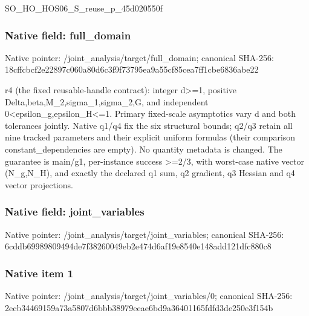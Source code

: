 \documentclass[10pt,a4paper]{article}
\begin{document}
\begingroup\raggedright\sloppy SO\_\allowbreak{}HO\_\allowbreak{}HOS06\_\allowbreak{}S\_\allowbreak{}reuse\_\allowbreak{}p\_\allowbreak{}45d020550f\par\endgroup

\subsubsection{Native field: full\_\allowbreak{}domain}
Native pointer: /joint\_\allowbreak{}analysis/target/full\_\allowbreak{}domain; canonical SHA-256: 18cffcbcf2e22897c060a80d6c3f9f73795ea9a55cf85cea7ff1cbe6836abe22

\begingroup\raggedright\sloppy r4 (the fixed reusable-handle contract):\allowbreak{} integer d>=\allowbreak{}1,\allowbreak{} positive Delta,\allowbreak{}beta,\allowbreak{}M\_\allowbreak{}2,\allowbreak{}sigma\_\allowbreak{}1,\allowbreak{}sigma\_\allowbreak{}2,\allowbreak{}G,\allowbreak{} and independent 0<epsilon\_\allowbreak{}g,\allowbreak{}epsilon\_\allowbreak{}H<=\allowbreak{}1. Primary fixed-scale asymptotics vary d and both tolerances jointly. Native q1/\allowbreak{}q4 fix the six structural bounds;\allowbreak{} q2/\allowbreak{}q3 retain all nine tracked parameters and their explicit uniform formulas (their comparison constant\_\allowbreak{}dependencies are empty). No quantity metadata is changed. The guarantee is main/\allowbreak{}g1,\allowbreak{} per-instance success >=\allowbreak{}2/\allowbreak{}3,\allowbreak{} with worst-case native vector (N\_\allowbreak{}g,\allowbreak{}N\_\allowbreak{}H),\allowbreak{} and exactly the declared q1 sum,\allowbreak{} q2 gradient,\allowbreak{} q3 Hessian and q4 vector projections.\par\endgroup

\subsubsection{Native field: joint\_\allowbreak{}variables}
Native pointer: /joint\_\allowbreak{}analysis/target/joint\_\allowbreak{}variables; canonical SHA-256: 6cddb69989809494de7f38260049eb2e474d6af19e8540e148add121dfc880c8

\subsubsection{Native item 1}
Native pointer: /joint\_\allowbreak{}analysis/target/joint\_\allowbreak{}variables/0; canonical SHA-256: 2ecb34469159a73a5807d6bbb38979eeae6bd9a36401165fdfd3de250e3f154b
\end{document}
